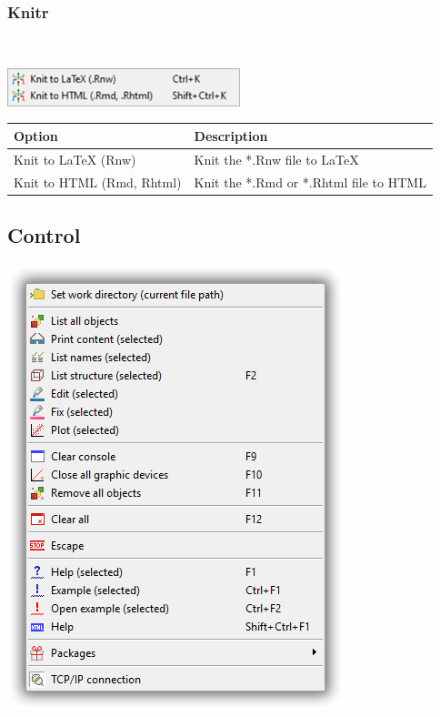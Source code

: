 \hypertarget{menu_r_send_knitr}{}
\subsubsection{Knitr}\\

\includegraphics[scale=0.50]{./res/menu_r_send_knitr.png}\\

\begin{scriptsize}\begin{tabularx}{\textwidth}{>{\hsize=0.3\hsize}X>{\hsize=0.7\hsize}X}\\
    \hline
    \textbf{Option} & \textbf{Description} \\
    \hline
    Knit to LaTeX (Rnw) & Knit the *.Rnw file to \LaTeX \\
    Knit to HTML (Rmd, Rhtml) & Knit the *.Rmd or *.Rhtml file to HTML\\
    \hline
  \end{tabularx}\end{scriptsize}


\hypertarget{menu_r_control}{}
\subsection{Control}

\includegraphics[scale=0.50]{./res/menu_r_control.png}\\


